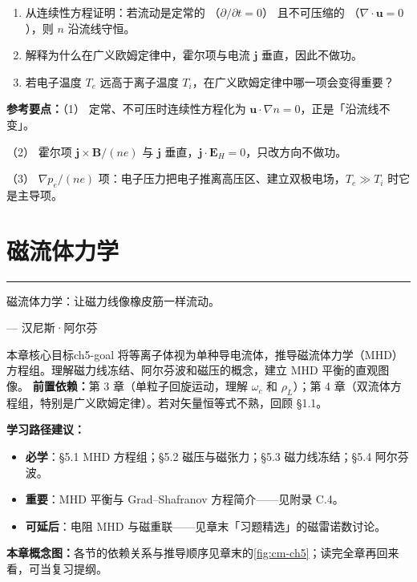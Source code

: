 \documentclass[12pt,a4paper,openany,oneside]{book}
\let\plainepigraph\epigraph
\renewcommand{\epigraph}[2]{%
  \par\addvspace{1.5pt}\noindent\hfill{\color{figAmber!75}\rule{2.8cm}{0.6pt}}\par
  \vspace{0.6pt}\plainepigraph{#1}{#2}}
\newcommand{\quizans}[1]{\par\medskip{\color{figGray}\rule{\linewidth}{0.3pt}}\par\smallskip
  {\footnotesize\textbf{参考要点：}#1}}
\newcommand{\vect}[1]{\bm{#1}}
\newcommand{\grad}{\nabla}
\newcommand{\divg}{\nabla\cdot}
\begin{document}
\begin{miniquiz}
\begin{enumerate}
\item 从连续性方程证明：若流动是定常的 （$\partial/\partial t = 0$） 且不可压缩的 （$\divg\vect{u}=0$），则 $n$ 沿流线守恒。
\item 解释为什么在广义欧姆定律中，霍尔项与电流 $\vect{j}$ 垂直，因此不做功。
\item 若电子温度 $T_e$ 远高于离子温度 $T_i$，在广义欧姆定律中哪一项会变得重要？
\end{enumerate}
\quizans{（1） 定常、不可压时连续性方程化为 $\vect u\cdot\grad n=0$，正是「沿流线不变」。\par （2） 霍尔项 $\vect j\times\vect B/(ne)$ 与 $\vect j$ 垂直，$\vect j\cdot\vect E_H=0$，只改方向不做功。\par （3） $\grad p_e/(ne)$ 项：电子压力把电子推离高压区、建立双极电场，$T_e\gg T_i$ 时它是主导项。}
\end{miniquiz}




\chapter{磁流体力学}\label{ch:5}
\epigraph{磁流体力学：让磁力线像橡皮筋一样流动。}{--- 汉尼斯·阿尔芬}

\begin{insight}{本章核心目标}{ch5-goal}
将等离子体视为单种导电流体，推导磁流体力学（MHD）方程组。理解磁力线冻结、阿尔芬波和磁压的概念，建立 MHD 平衡的直观图像。
\tcblower
\textbf{前置依赖：}第 3 章（单粒子回旋运动，理解 $\omega_c$ 和 $\rho_L$）；第 4 章（双流体方程组，特别是广义欧姆定律）。若对矢量恒等式不熟，回顾 \S 1.1。

\textbf{学习路径建议：}

\begin{itemize}[leftmargin=*]
\item[\textcolor{red}{$\blacksquare$}] \textbf{必学}：\S 5.1 MHD 方程组；\S 5.2 磁压与磁张力；\S 5.3 磁力线冻结；\S 5.4 阿尔芬波。
\item[\textcolor{orange}{$\blacksquare$}] \textbf{重要}：MHD 平衡与 Grad--Shafranov 方程简介——见附录 C.4。
\item[\textcolor{green}{$\blacksquare$}] \textbf{可延后}：电阻 MHD 与磁重联——见章末「习题精选」的磁雷诺数讨论。
\end{itemize}
\textbf{本章概念图：}各节的依赖关系与推导顺序见章末的\cref{fig:cm-ch5}；读完全章再回来看，可当复习提纲。
\end{insight}
\end{document}
